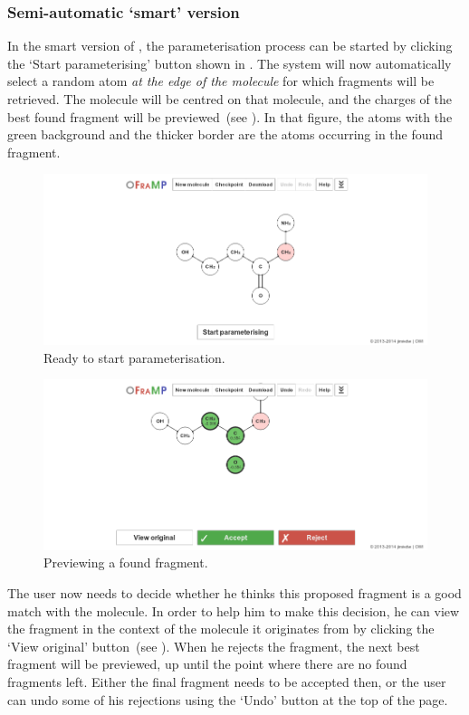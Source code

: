 \subsubsection{Semi-automatic `smart' version}
In the smart version of \oframp, the parameterisation process can be started by clicking the `Start parameterising' button shown in . The system will now automatically select a random atom \emph{at the edge of the molecule} for which fragments will be retrieved. The molecule will be centred on that molecule, and the charges of the best found fragment will be previewed~(see ). In that figure, the atoms with the green background and the thicker border are the atoms occurring in the found fragment.

\begin{figure}
\center
\includegraphics[width=.9\textwidth]{img/find_3.png}
\caption{Ready to start parameterisation.}
\end{figure}

\begin{figure}
\center
\includegraphics[width=.9\textwidth]{img/find_4.png}
\caption{Previewing a found fragment.}
\end{figure}

The user now needs to decide whether he thinks this proposed fragment is a good match with the molecule. In order to help him to make this decision, he can view the fragment in the context of the molecule it originates from by clicking the `View original' button~(see ). When he rejects the fragment, the next best fragment will be previewed, up until the point where there are no found fragments left. Either the final fragment needs to be accepted then, or the user can undo some of his rejections using the `Undo' button at the top of the page.

